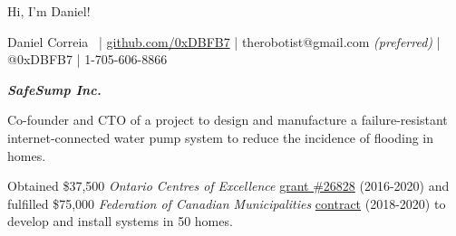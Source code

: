 \documentclass[fleqn,11pt]{article}
\newcommand{\ressection}[1]{\textbf{{\Large \textit{#1}}}\xrfill[0.1ex]{0.6pt}}
\begin{document}
%
%
%
%
%
%
%
%
%
%
%
%


\begingroup
{}\selectfont

{\Huge Hi, I'm Daniel!}

\endgroup


\begin{center}
\small{{Daniel Correia}\  | \href{https://github.com/0xDBFB7}{github.com/0xDBFB7} | therobotist@gmail.com \textit{(preferred)} | @0xDBFB7 | 1-705-606-8866}\\
\end{center}




\ressection{SafeSump Inc.}

Co-founder and CTO of a project to design and manufacture a failure-resistant internet-connected water pump system to reduce the incidence of flooding in homes. %

Obtained \$37,500 \textit{Ontario Centres of Excellence} \href{https://drive.google.com/file/d/1WXrxVwTggaL7WEvLv6DgJ891fSo7LqqP/view?usp=sharing}{grant \#26828} (2016-2020) and fulfilled \$75,000 \textit{Federation of Canadian Municipalities} \href{https://drive.google.com/file/d/11pdJNzYDE-28X3m0rH8mE4cxoliTJZGH/view?usp=sharing}{contract} (2018-2020) to develop and install systems in 50 homes.
\end{document}
